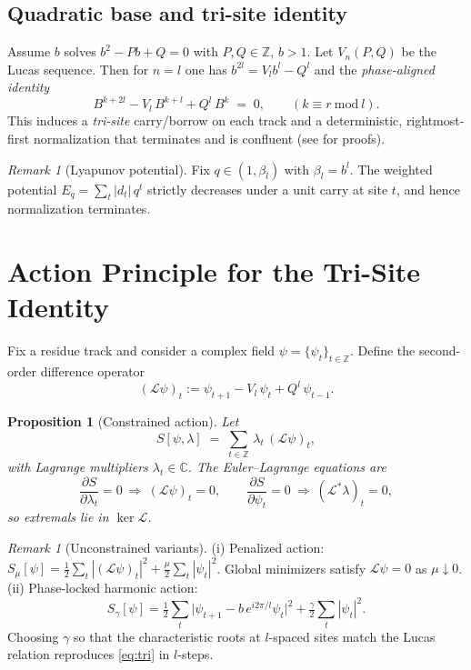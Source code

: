 \documentclass[11pt]{article}
\newtheorem{proposition}[theorem]{Proposition}
\theoremstyle{definition}
\theoremstyle{remark}
\newtheorem{remark}[theorem]{Remark}
\newcommand{\Z}{\mathbb{Z}}
\begin{document}
\subsection{Quadratic base and tri-site identity}
Assume $b$ solves $b^2-Pb+Q=0$ with $P,Q\in\Z$, $b>1$.
Let $V_n(P,Q)$ be the Lucas sequence.
Then for $n=l$ one has $b^{2l}=V_l b^l - Q^l$ and the \emph{phase-aligned identity}
\begin{equation}\label{eq:tri}
B^{k+2l} - V_l\,B^{k+l} + Q^l\,B^{k} \;=\; 0,\qquad (k\equiv r\ \mathrm{mod}\ l).
\end{equation}
This induces a \emph{tri-site} carry/borrow on each track and a deterministic, rightmost-first normalization that terminates and is confluent (see \cite{VR_AI_ComplexBase} for proofs).

\begin{remark}[Lyapunov potential]
Fix $q\in(1,\beta_l)$ with $\beta_l=b^l$. The weighted potential $E_q=\sum_t |d_t|\,q^t$ strictly decreases under a unit carry at site $t$, and hence normalization terminates.
\end{remark}





\section{Action Principle for the Tri-Site Identity}
\label{sec:action-trisite}

Fix a residue track and consider a complex field $\psi=\{\psi_t\}_{t\in\mathbb Z}$. Define the second-order difference operator
\[
(\mathcal L\psi)_t := \psi_{t+1}-V_l\,\psi_t+Q^l\,\psi_{t-1}.
\]

\begin{proposition}[Constrained action]
Let
\[
S[\psi,\lambda] \;=\; \sum_{t\in\mathbb Z}\, \lambda_t\,(\mathcal L\psi)_t,
\]
with Lagrange multipliers $\lambda_t\in\mathbb C$. The Euler--Lagrange equations are
\[
\frac{\partial S}{\partial \lambda_t} = 0 \ \Rightarrow\  (\mathcal L\psi)_t=0,\qquad
\frac{\partial S}{\partial \psi_t} = 0 \ \Rightarrow\  (\mathcal L^\ast\lambda)_t=0,
\]
so extremals lie in $\ker \mathcal L$.
\end{proposition}

\begin{remark}[Unconstrained variants]
(i) Penalized action: $S_\mu[\psi]=\tfrac12\sum_t |(\mathcal L\psi)_t|^2+\tfrac\mu2\sum_t|\psi_t|^2$.
Global minimizers satisfy $\mathcal L\psi=0$ as $\mu\downarrow0$.
(ii) Phase-locked harmonic action:
\[
S_\gamma[\psi]=\tfrac12\sum_t\big|\psi_{t+1}-b\,e^{i2\pi/l}\psi_t\big|^2+\tfrac\gamma2\sum_t|\psi_t|^2.
\]
Choosing $\gamma$ so that the characteristic roots at $l$-spaced sites match the Lucas relation reproduces \eqref{eq:tri} in $l$-steps.
\end{remark}
\end{document}
